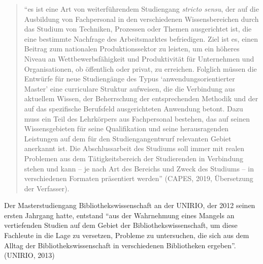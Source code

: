 \documentclass[a4paper,
fontsize=11pt,
oneside,
numbers=noperiodatend,
parskip=half-,
bibliography=totoc,
final
]{scrartcl}
\begin{document}
\begin{quote}
\enquote{es ist eine Art von weiterführendem Studiengang \emph{stricto
sensu}, der auf die Ausbildung von Fachpersonal in den verschiedenen
Wissensbereichen durch das Studium von Techniken, Prozessen oder Themen
ausgerichtet ist, die eine bestimmte Nachfrage des Arbeitsmarktes
befriedigen. Ziel ist es, einen Beitrag zum nationalen Produktionssektor
zu leisten, um ein höheres Niveau an Wettbewerbsfähigkeit und
Produktivität für Unternehmen und Organisationen, ob öffentlich oder
privat, zu erreichen. Folglich müssen die Entwürfe für neue Studiengänge
des Typus \enquote{anwendungsorientierter Master} eine curriculare Struktur
aufweisen, die die Verbindung aus aktuellem Wissen, der Beherrschung der
entsprechenden Methodik und der auf das spezifische Berufsfeld
ausgerichteten Anwendung betont. Dazu muss ein Teil des Lehrkörpers aus
Fachpersonal bestehen, das auf seinen Wissensgebieten für seine
Qualifikation und seine herausragenden Leistungen auf dem für den
Studiengangentwurf relevanten Gebiet anerkannt ist. Die Abschlussarbeit
des Studiums soll immer mit realen Problemen aus dem Tätigkeitsbereich
der Studierenden in Verbindung stehen und kann -- je nach Art des
Bereichs und Zweck des Studiums -- in verschiedenen Formaten präsentiert
werden} (CAPES, 2019, Übersetzung der Verfasser).
\end{quote}

Der Masterstudiengang Bibliothekswissenschaft an der UNIRIO, der 2012
seinen ersten Jahrgang hatte, entstand \enquote{aus der Wahrnehmung
eines Mangels an vertiefenden Studien auf dem Gebiet der
Bibliothekswissenschaft, um diese Fachleute in die Lage zu versetzen,
Probleme zu untersuchen, die sich aus dem Alltag der
Bibliothekswissenschaft in verschiedenen Bibliotheken ergeben}. (UNIRIO,
2013)
\end{document}
